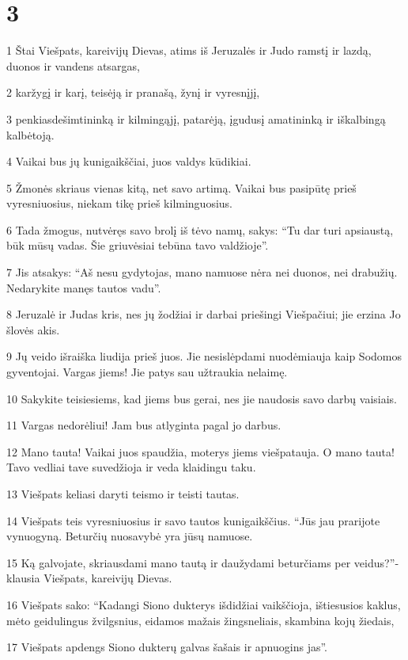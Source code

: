 \chapter{3}


\par 1 Štai Viešpats, kareivijų Dievas, atims iš Jeruzalės ir Judo ramstį ir lazdą, duonos ir vandens atsargas, 
\par 2 karžygį ir karį, teisėją ir pranašą, žynį ir vyresnįjį, 
\par 3 penkiasdešimtininką ir kilmingąjį, patarėją, įgudusį amatininką ir iškalbingą kalbėtoją. 
\par 4 Vaikai bus jų kunigaikščiai, juos valdys kūdikiai. 
\par 5 Žmonės skriaus vienas kitą, net savo artimą. Vaikai bus pasipūtę prieš vyresniuosius, niekam tikę prieš kilminguosius. 
\par 6 Tada žmogus, nutvėręs savo brolį iš tėvo namų, sakys: “Tu dar turi apsiaustą, būk mūsų vadas. Šie griuvėsiai tebūna tavo valdžioje”. 
\par 7 Jis atsakys: “Aš nesu gydytojas, mano namuose nėra nei duonos, nei drabužių. Nedarykite manęs tautos vadu”. 
\par 8 Jeruzalė ir Judas kris, nes jų žodžiai ir darbai priešingi Viešpačiui; jie erzina Jo šlovės akis. 
\par 9 Jų veido išraiška liudija prieš juos. Jie nesislėpdami nuodėmiauja kaip Sodomos gyventojai. Vargas jiems! Jie patys sau užtraukia nelaimę. 
\par 10 Sakykite teisiesiems, kad jiems bus gerai, nes jie naudosis savo darbų vaisiais. 
\par 11 Vargas nedorėliui! Jam bus atlyginta pagal jo darbus. 
\par 12 Mano tauta! Vaikai juos spaudžia, moterys jiems viešpatauja. O mano tauta! Tavo vedliai tave suvedžioja ir veda klaidingu taku. 
\par 13 Viešpats keliasi daryti teismo ir teisti tautas. 
\par 14 Viešpats teis vyresniuosius ir savo tautos kunigaikščius. “Jūs jau prarijote vynuogyną. Beturčių nuosavybė yra jūsų namuose. 
\par 15 Ką galvojate, skriausdami mano tautą ir daužydami beturčiams per veidus?”­klausia Viešpats, kareivijų Dievas. 
\par 16 Viešpats sako: “Kadangi Siono dukterys išdidžiai vaikščioja, ištiesusios kaklus, mėto geidulingus žvilgsnius, eidamos mažais žingsneliais, skambina kojų žiedais, 
\par 17 Viešpats apdengs Siono dukterų galvas šašais ir apnuogins jas”. 
